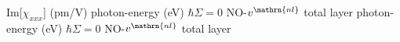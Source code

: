 \documentclass{article}
\begin{document}
\stopmpxshipout
{}%
\stopmpxshipout
{}%
\stopmpxshipout
{}%
\stopmpxshipout
{}%
\stopmpxshipout
{}%
\stopmpxshipout
{}%
\stopmpxshipout
{}%
\stopmpxshipout
{}%
\stopmpxshipout
{}%
\stopmpxshipout
{}%
\stopmpxshipout
\mpxshipout%
\Large Im[$\chi_{xxx}$] (pm/V)%
\stopmpxshipout
\mpxshipout%
\Large photon-energy (eV)%
\stopmpxshipout
\mpxshipout%
\Large $\hbar\Sigma=0$ NO-$v^{\mathrn{nl}}$%
\stopmpxshipout
\mpxshipout%
total%
\stopmpxshipout
\mpxshipout%
layer%
\stopmpxshipout
{}%
\stopmpxshipout
{}%
\stopmpxshipout
{}%
\stopmpxshipout
{}%
\stopmpxshipout
{}%
\stopmpxshipout
{}%
\stopmpxshipout
{}%
\stopmpxshipout
{}%
\stopmpxshipout
{}%
\stopmpxshipout
{}%
\stopmpxshipout
{}%
\stopmpxshipout
{}%
\stopmpxshipout
{}%
\stopmpxshipout
{}%
\stopmpxshipout
{}%
\stopmpxshipout
\mpxshipout%
\Large photon-energy (eV)%
\stopmpxshipout
\mpxshipout%
\Large $\hbar\Sigma=0$ NO-$v^{\mathrn{nl}}$%
\stopmpxshipout
\mpxshipout%
total%
\stopmpxshipout
\mpxshipout%
layer%
\stopmpxshipout
 
\end{document}
